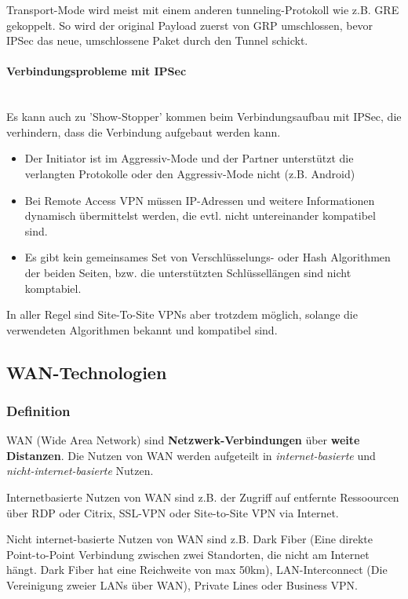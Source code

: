 \documentclass[a4paper, 11pt]{article}
\begin{document}
Transport-Mode wird meist mit einem anderen tunneling-Protokoll wie z.B. GRE gekoppelt. So wird der original Payload zuerst von GRP umschlossen, bevor IPSec das neue, umschlossene Paket durch den Tunnel schickt.

\paragraph{Verbindungsprobleme mit IPSec} \mbox{} \\
Es kann auch zu 'Show-Stopper' kommen beim Verbindungsaufbau mit IPSec, die verhindern, dass die Verbindung aufgebaut werden kann.

\begin{itemize}
	\item Der Initiator ist im Aggressiv-Mode und der Partner unterstützt die verlangten Protokolle oder den Aggressiv-Mode nicht (z.B. Android)
	\item Bei Remote Access VPN müssen IP-Adressen und weitere Informationen dynamisch übermittelst werden, die evtl. nicht untereinander kompatibel sind.
	\item Es gibt kein gemeinsames Set von Verschlüsselungs- oder Hash Algorithmen der beiden Seiten, bzw. die unterstützten Schlüssellängen sind nicht komptabiel.
\end{itemize}

In aller Regel sind Site-To-Site VPNs aber trotzdem möglich, solange die verwendeten Algorithmen bekannt und kompatibel sind.

\newpage

\subsection{WAN-Technologien}
\subsubsection{Definition}
WAN (Wide Area Network) sind \textbf{Netzwerk-Verbindungen} über \textbf{weite Distanzen}. Die Nutzen von WAN werden aufgeteilt in \textit{internet-basierte} und \textit{nicht-internet-basierte} Nutzen.
\vspace{10px}

\noindent  Internetbasierte Nutzen von WAN sind z.B. der Zugriff auf entfernte Ressoourcen über RDP oder Citrix, SSL-VPN oder Site-to-Site VPN via Internet.

\vspace{10px}

\noindent Nicht internet-basierte Nutzen von WAN sind z.B. Dark Fiber (Eine direkte Point-to-Point Verbindung zwischen zwei Standorten, die nicht am Internet hängt. Dark Fiber hat eine Reichweite von max 50km), LAN-Interconnect (Die Vereinigung zweier LANs über WAN), Private Lines oder Business VPN.
\end{document}
